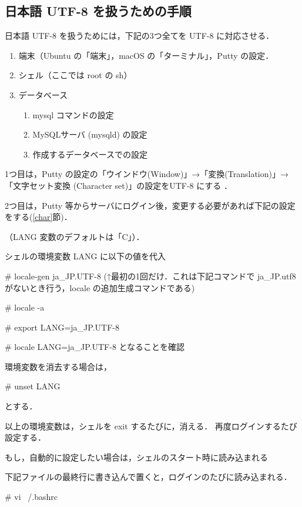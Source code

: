 \subsection{日本語 UTF-8 を扱うための手順}
\label{sec:japanese-locale}

日本語 UTF-8 を扱うためには，下記の3つ全てを UTF-8 に対応させる．
\begin{enumerate}
 \item 端末（Ubuntu の「端末」，macOS の「ターミナル」，Putty の設定．
 \item シェル（ここでは root の sh）
 \item データベース
       \begin{enumerate}
	\item mysql コマンドの設定
	\item MySQLサーバ (mysqld) の設定
	\item 作成するデータベースでの設定
       \end{enumerate}
\end{enumerate}

1つ目は，Putty の設定の「ウインドウ(Window)」→「変換(Translation)」→
「文字セット変換 (Character set)」の設定をUTF-8 にする
．

2つ目は，Putty 等からサーバにログイン後，変更する必要があれば下記の設定
をする(\ref{char}節)．

（LANG 変数のデフォルトは「C」）．

\begin{cli}
シェルの環境変数 LANG に以下の値を代入

# locale-gen ja_JP.UTF-8
(↑最初の1回だけ．これは下記コマンドで ja_JP.utf8 がないとき行う，locale の追加生成コマンドである)

# locale -a

# export LANG=ja_JP.UTF-8

# locale
LANG=ja_JP.UTF-8
となることを確認

環境変数を消去する場合は，

# unset LANG

とする．

以上の環境変数は，シェルを exit するたびに，消える．
再度ログインするたび設定する．

もし，自動的に設定したい場合は，シェルのスタート時に読み込まれる

下記ファイルの最終行に書き込んで置くと，ログインのたびに読み込まれる．

# vi ~/.bashrc

\end{cli}

